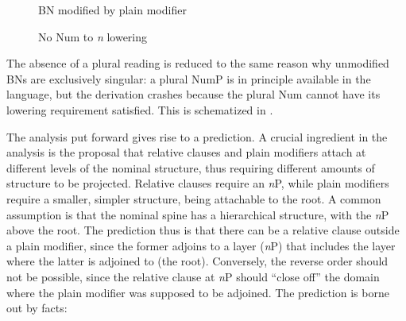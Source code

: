 \documentclass[output=paper]{langscibook}
\begin{document}
\begin{figure}[h]
\RawFloats
\centering
\begin{minipage}[b]{0.49\textwidth}
\centering
{}
        \caption{BN modified by plain modifier}
        \label{fon:pLEjNBrZlTrE}
\end{minipage}
\begin{minipage}[b]{0.49\textwidth}
\centering
{}
        \caption{No Num to \textit{n} lowering}
        \label{fig:BrexApNoLowWw}
\end{minipage}
\end{figure}

		
\noindent   The absence of a plural reading is reduced to the same reason why unmodified BNs are exclusively singular: a plural NumP is in principle available in the language, but the derivation crashes because the plural Num cannot have its lowering requirement satisfied. This is schematized in .
	
	The analysis put forward gives rise to a prediction. A crucial ingredient in the analysis is the proposal that relative clauses and plain modifiers attach at different levels of the nominal structure, thus requiring different amounts of structure to be projected. Relative clauses require an \textit{n}P, while plain modifiers require a smaller, simpler structure, being attachable to the root. A common assumption is that the nominal spine has a hierarchical structure, with the \textit{n}P above the root. The prediction thus is that there can be a relative clause outside a plain modifier, since the former adjoins to a layer (\textit{n}P) that includes the layer where the latter is adjoined to (the root). Conversely, the reverse order should not be possible, since the relative clause at \textit{n}P should ``close off'' the domain where the plain modifier was supposed to be adjoined. The prediction is borne out by facts:
	
\end{document}
